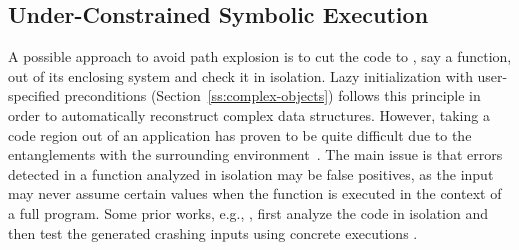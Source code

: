 \subsection{Under-Constrained Symbolic Execution} 
\label{under-constrained}

A possible approach to avoid path explosion is to cut the code to , say a function, out of its enclosing system and check it in isolation. Lazy initialization with user-specified preconditions (Section~\ref{ss:complex-objects}) follows this principle in order to automatically reconstruct complex  data structures. However, taking a code region out of an application has proven to be quite difficult due to the entanglements with the surrounding environment~\cite{ED-ISSTA07}.
The main issue is that errors detected in a function analyzed in isolation may be false positives, as the input may never assume certain values when the function is executed in the context of a full program. Some prior works, e.g., \cite{CS-ICSE05}, first analyze the code in isolation and then test the generated crashing inputs using concrete executions .


